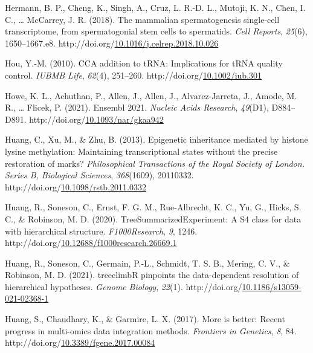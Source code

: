 \documentclass[12pt,twoside]{reedthesis}
\newlength{\cslhangindent}
\newenvironment{CSLReferences}[2] %
 {%
  \setlength{\parindent}{0pt}
  \ifodd #1 \everypar{\setlength{\hangindent}{\cslhangindent}}\ignorespaces\fi
  \ifnum #2 > 0
  \setlength{\parskip}{#2\baselineskip}
  \fi
 }%
 {}
\begin{document}
\begin{CSLReferences}{1}{0}
\leavevmode{}%
Hermann, B. P., Cheng, K., Singh, A., Cruz, L. R.-D. L., Mutoji, K. N., Chen, I. C., \ldots{} McCarrey, J. R. (2018). The mammalian spermatogenesis single-cell transcriptome, from spermatogonial stem cells to spermatids. \emph{Cell Reports}, \emph{25}(6), 1650--1667.e8. http://doi.org/\href{https://doi.org/10.1016/j.celrep.2018.10.026}{10.1016/j.celrep.2018.10.026}

\leavevmode{}%
Hou, Y.-M. (2010). CCA addition to tRNA: Implications for tRNA quality control. \emph{IUBMB Life}, \emph{62}(4), 251--260. http://doi.org/\href{https://doi.org/10.1002/iub.301}{10.1002/iub.301}

\leavevmode{}%
Howe, K. L., Achuthan, P., Allen, J., Allen, J., Alvarez-Jarreta, J., Amode, M. R., \ldots{} Flicek, P. (2021). Ensembl 2021. \emph{Nucleic Acids Research}, \emph{49}(D1), D884--D891. http://doi.org/\href{https://doi.org/10.1093/nar/gkaa942}{10.1093/nar/gkaa942}

\leavevmode{}%
Huang, C., Xu, M., \& Zhu, B. (2013). Epigenetic inheritance mediated by histone lysine methylation: Maintaining transcriptional states without the precise restoration of marks? \emph{Philosophical Transactions of the Royal Society of London. Series B, Biological Sciences}, \emph{368}(1609), 20110332. http://doi.org/\href{https://doi.org/10.1098/rstb.2011.0332}{10.1098/rstb.2011.0332}

\leavevmode{}%
Huang, R., Soneson, C., Ernst, F. G. M., Rue-Albrecht, K. C., Yu, G., Hicks, S. C., \& Robinson, M. D. (2020). TreeSummarizedExperiment: A S4 class for data with hierarchical structure. \emph{F1000Research}, \emph{9}, 1246. http://doi.org/\href{https://doi.org/10.12688/f1000research.26669.1}{10.12688/f1000research.26669.1}

\leavevmode{}%
Huang, R., Soneson, C., Germain, P.-L., Schmidt, T. S. B., Mering, C. V., \& Robinson, M. D. (2021). treeclimbR pinpoints the data-dependent resolution of hierarchical hypotheses. \emph{Genome Biology}, \emph{22}(1). http://doi.org/\href{https://doi.org/10.1186/s13059-021-02368-1}{10.1186/s13059-021-02368-1}

\leavevmode{}%
Huang, S., Chaudhary, K., \& Garmire, L. X. (2017). More is better: Recent progress in multi-omics data integration methods. \emph{Frontiers in Genetics}, \emph{8}, 84. http://doi.org/\href{https://doi.org/10.3389/fgene.2017.00084}{10.3389/fgene.2017.00084}


\end{CSLReferences}
\end{document}

